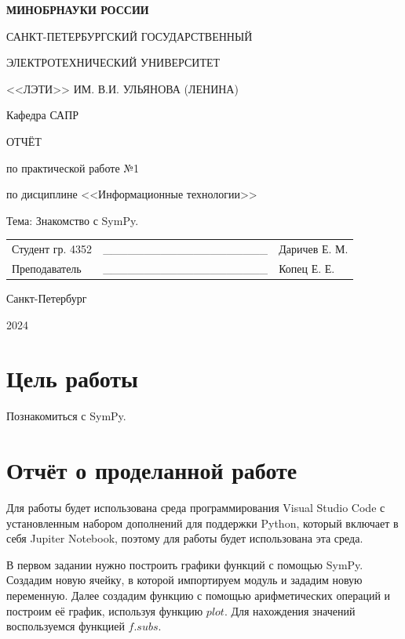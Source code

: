 \documentclass[14pt,a4paper]{extarticle}
\begin{document}
\begin{titlepage}
    \begin{center}
        {\bfseries
        МИНОБРНАУКИ РОССИИ\par
        САНКТ-ПЕТЕРБУРГСКИЙ ГОСУДАРСТВЕННЫЙ\par
        ЭЛЕКТРОТЕХНИЧЕСКИЙ УНИВЕРСИТЕТ\par
        <<ЛЭТИ>> ИМ. В.И. УЛЬЯНОВА (ЛЕНИНА)\par
        Кафедра САПР

        \vspace{0.23\textheight}
        ОТЧЁТ\par
        по практической работе №1\par
        по дисциплине <<Информационные технологии>>\par
        Тема: Знакомство с SymPy.
        \vspace{0.28\textheight}
        }
        \begin{table}[!ht]
            \begin{tabularx}{\textwidth}{p{60mm}X>{\centering\arraybackslash}p{45mm}}
                Студент гр. 4352 & \_\_\_\_\_\_\_\_\_\_\_\_\_\_\_\_\_\_\_\_ & {Даричев Е. М.} \\ [5.4mm]  %
                Преподаватель    & \_\_\_\_\_\_\_\_\_\_\_\_\_\_\_\_\_\_\_\_ & {Копец Е. Е.} \\ [5.4mm]
            \end{tabularx}
        \end{table}

        Санкт-Петербург\par
        2024
    \end{center}
\end{titlepage}
\setcounter{page}{2}

\section*{Цель работы}
Познакомиться с SymPy.

\section*{Отчёт о проделанной работе}
Для работы будет использована среда программирования Visual Studio
Code с установленным набором дополнений для поддержки Python, который
включает в себя Jupiter Notebook, поэтому для работы будет использована
эта среда.

В первом задании нужно построить графики функций с помощью SymPy.
Создадим новую ячейку, в которой импортируем модуль и зададим новую
переменную. Далее создадим функцию с помощью арифметических операций и
построим её график, используя функцию $plot$. Для нахождения значений
воспользуемся функцией $f.subs$.
\end{document}
